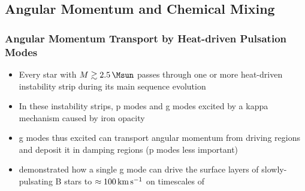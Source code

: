 
\subsection{Angular Momentum and Chemical Mixing}


{\color{brown}
\subsubsection{Angular Momentum Transport by Heat-driven Pulsation Modes}

\begin{itemize}
\item Every star with $M \gtrsim 2.5\,\Msun$ passes through one or more heat-driven instability strip during its main sequence evolution
\item In these instability strips, p modes and g modes excited by a kappa mechanism caused by iron opacity
\item g modes thus excited can transport angular momentum from driving regions and deposit it in damping regions (p modes less important)
\item \citet{Townsend:2017} demonstrated how a single g mode can drive the surface layers of slowly-pulsating B stars to $\approx 100\,{\rm km\,s^{-1}}$ on timescales of 
\end{itemize}


}


